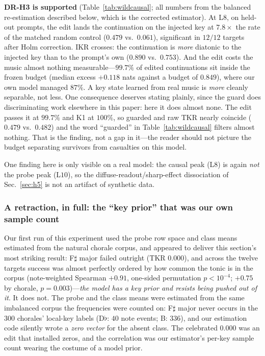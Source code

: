 \documentclass[conference]{IEEEtran}
\makeatletter
\newcommand{\tkr}{\mathrm{TKR}}
\newcommand{\ikr}{\mathrm{IKR}}
\newcommand{\vs}{vs.\@\ }
\makeatother
\begin{document}
\textbf{DR-H3 is supported} (Table~\ref{tab:wildcausal}; all numbers from the
balanced re-estimation described below, which is the corrected estimator). At L$8$,
on held-out prompts, the edit lands the continuation on the injected key at
$7.8\times$ the rate of the matched random control ($0.479$ \vs $0.061$),
significant in $12/12$ targets after Holm correction. $\ikr$ crosses: the
continuation is \emph{more} diatonic to the injected key than to the prompt's own
($0.890$ \vs $0.753$). And the edit costs the music almost nothing
measurable---$99.7\%$ of edited continuations sit inside the frozen budget (median
excess $+0.118$ nats against a budget of $0.849$), where our own model managed
$87\%$. A key state learned from real music is \emph{more} cleanly separable, not
less. One consequence deserves stating plainly, since the guard does discriminating
work elsewhere in this paper: here it does almost none. The edit passes it at
$99.7\%$ and K1 at $100\%$, so guarded and raw $\tkr$ nearly coincide ($0.479$
\vs $0.482$) and the word ``guarded'' in Table~\ref{tab:wildcausal} filters almost
nothing. That is the finding, not a gap in it---the reader should not picture the
budget separating survivors from casualties on this model.

One finding here is only visible on a real model: the causal peak (L$8$) is again
\emph{not} the probe peak (L$10$), so the diffuse-readout/sharp-effect dissociation
of Sec.~\ref{sec:h5} is not an artifact of synthetic data.

\subsubsection{A retraction, in full: the ``key prior'' that was our own sample count}
\label{sec:priorretract}
Our first run of this experiment used the probe row space and class means estimated
from the natural chorale corpus, and appeared to deliver this section's most
striking result: F$\sharp$ major failed outright ($\tkr$ $0.000$), and across the
twelve targets success was almost perfectly ordered by how common the tonic is in
the corpus (note-weighted Spearman $+0.91$, one-sided permutation $p<10^{-4}$;
$+0.75$ by chorale, $p=0.003$)---\emph{the model has a key prior and resists being
pushed out of it}. It does not. The probe and the class means were estimated from
the same imbalanced corpus the frequencies were counted on: F$\sharp$ major never
occurs in the $300$ chorales' local-key labels (D$\flat$: $40$ note events; B:
$336$), and our estimation code silently wrote a \emph{zero vector} for the absent
class. The celebrated $0.000$ was an edit that installed zeros, and the correlation
was our estimator's per-key sample count wearing the costume of a model prior.
\end{document}
